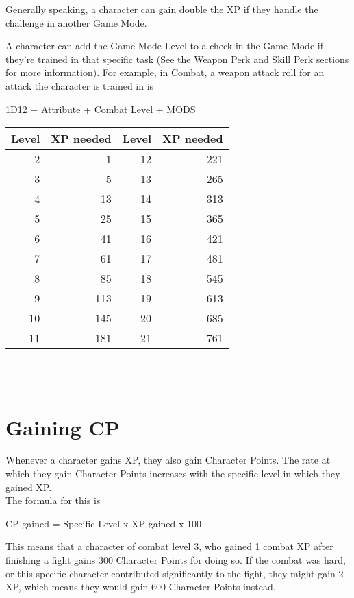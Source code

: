 Generally speaking, a character can gain double the XP if they handle the challenge in another Game Mode.

A character can add the Game Mode Level to a check in the Game Mode if they're trained in that specific task (See the Weapon Perk and Skill Perk sections for more information). For example, in Combat, a weapon attack roll for an attack the character is trained in is \\
\begin{center}
	
1D12 + Attribute + Combat Level + MODS\\


\begin{tabular}{r r | r r}
Level & XP needed & Level & XP needed\\ \hline
2 & 1 & 12 & 221\\
3 & 5 & 13 & 265\\
4 & 13 & 14 & 313\\
5 & 25 & 15 & 365\\
6 & 41 & 16 & 421\\
7 & 61 & 17 & 481\\
8 & 85 & 18 & 545\\
9 & 113 & 19 & 613\\
10 & 145 & 20 & 685\\
11 & 181 & 21 & 761\\
\end{tabular}\\~\\

\end{center}

\section{Gaining CP}

Whenever a character gains XP, they also gain Character Points. The rate at which they gain Character Points increases with the specific level in which they gained XP.\\
The formula for this is\\

\begin{center}
	CP gained = Specific Level x XP gained  x 100
\end{center}

This means that a character of combat level 3, who gained 1 combat XP after finishing a fight gains 300 Character Points for doing so. If the combat was hard, or this specific character contributed significantly to the fight, they might gain 2 XP, which means they would gain 600 Character Points instead.\\


